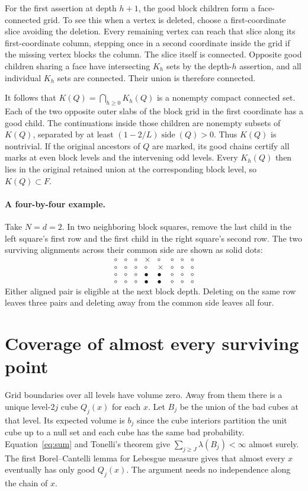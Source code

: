 \documentclass[11pt]{amsart}
\begin{document}
For the first assertion at depth $h+1$, the good block children form a face-connected grid. To see this when a vertex is deleted, choose a first-coordinate slice avoiding the deletion. Every remaining vertex can reach that slice along its first-coordinate column, stepping once in a second coordinate inside the grid if the missing vertex blocks the column. The slice itself is connected. Opposite good children sharing a face have intersecting $K_h$ sets by the depth-$h$ assertion, and all individual $K_h$ sets are connected. Their union is therefore connected.

It follows that $K(Q)=\bigcap_{h\ge0}K_h(Q)$ is a nonempty compact connected set. Each of the two opposite outer slabs of the block grid in the first coordinate has a good child. The continuations inside those children are nonempty subsets of $K(Q)$, separated by at least $(1-2/L)\operatorname{side}(Q)>0$. Thus $K(Q)$ is nontrivial. If the original ancestors of $Q$ are marked, its good chains certify all marks at even block levels and the intervening odd levels. Every $K_h(Q)$ then lies in the original retained union at the corresponding block level, so $K(Q)\subset F$.

\paragraph{A four-by-four example.}
Take $N=d=2$. In two neighboring block squares, remove the last child in the left square's first row and the first child in the right square's second row. The two surviving alignments across their common side are shown as solid dots:
\[
\begin{array}{cccc|cccc}
\circ&\circ&\circ&\times&\circ&\circ&\circ&\circ\\
\circ&\circ&\circ&\circ&\times&\circ&\circ&\circ\\
\circ&\circ&\circ&\bullet&\bullet&\circ&\circ&\circ\\
\circ&\circ&\circ&\bullet&\bullet&\circ&\circ&\circ
\end{array}
\]
Either aligned pair is eligible at the next block depth. Deleting on the same row leaves three pairs and deleting away from the common side leaves all four.

\section{Coverage of almost every surviving point}
Grid boundaries over all levels have volume zero. Away from them there is a unique level-$2j$ cube $Q_j(x)$ for each $x$. Let $B_j$ be the union of the bad cubes at that level. Its expected volume is $b_j$ since the cube interiors partition the unit cube up to a null set and each cube has the same bad probability. Equation~\eqref{eq:sum} and Tonelli's theorem give $\sum_{j\ge J}\lambda(B_j)<\infty$ almost surely. The first Borel--Cantelli lemma for Lebesgue measure gives that almost every $x$ eventually has only good $Q_j(x)$. The argument needs no independence along the chain of $x$.
\end{document}
